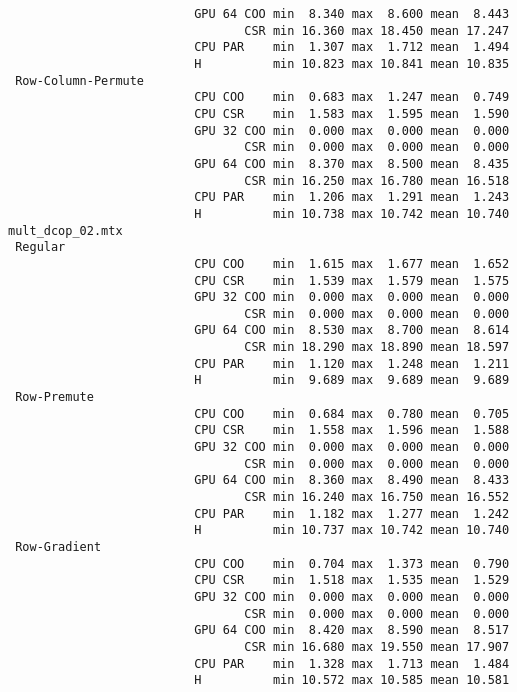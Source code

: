 \begin{verbatim}
                          GPU 64 COO min  8.340 max  8.600 mean  8.443
                                 CSR min 16.360 max 18.450 mean 17.247
                          CPU PAR    min  1.307 max  1.712 mean  1.494
                          H          min 10.823 max 10.841 mean 10.835
 Row-Column-Permute
                          CPU COO    min  0.683 max  1.247 mean  0.749
                          CPU CSR    min  1.583 max  1.595 mean  1.590
                          GPU 32 COO min  0.000 max  0.000 mean  0.000
                                 CSR min  0.000 max  0.000 mean  0.000
                          GPU 64 COO min  8.370 max  8.500 mean  8.435
                                 CSR min 16.250 max 16.780 mean 16.518
                          CPU PAR    min  1.206 max  1.291 mean  1.243
                          H          min 10.738 max 10.742 mean 10.740
mult_dcop_02.mtx
 Regular
                          CPU COO    min  1.615 max  1.677 mean  1.652
                          CPU CSR    min  1.539 max  1.579 mean  1.575
                          GPU 32 COO min  0.000 max  0.000 mean  0.000
                                 CSR min  0.000 max  0.000 mean  0.000
                          GPU 64 COO min  8.530 max  8.700 mean  8.614
                                 CSR min 18.290 max 18.890 mean 18.597
                          CPU PAR    min  1.120 max  1.248 mean  1.211
                          H          min  9.689 max  9.689 mean  9.689
 Row-Premute
                          CPU COO    min  0.684 max  0.780 mean  0.705
                          CPU CSR    min  1.558 max  1.596 mean  1.588
                          GPU 32 COO min  0.000 max  0.000 mean  0.000
                                 CSR min  0.000 max  0.000 mean  0.000
                          GPU 64 COO min  8.360 max  8.490 mean  8.433
                                 CSR min 16.240 max 16.750 mean 16.552
                          CPU PAR    min  1.182 max  1.277 mean  1.242
                          H          min 10.737 max 10.742 mean 10.740
 Row-Gradient
                          CPU COO    min  0.704 max  1.373 mean  0.790
                          CPU CSR    min  1.518 max  1.535 mean  1.529
                          GPU 32 COO min  0.000 max  0.000 mean  0.000
                                 CSR min  0.000 max  0.000 mean  0.000
                          GPU 64 COO min  8.420 max  8.590 mean  8.517
                                 CSR min 16.680 max 19.550 mean 17.907
                          CPU PAR    min  1.328 max  1.713 mean  1.484
                          H          min 10.572 max 10.585 mean 10.581

\end{verbatim}
